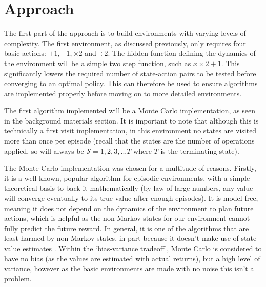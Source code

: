 \chapter{Approach}
\begin{comment}
\begin{itemize}
\item mc
\item mc with separate types then speed discarded
\item q learning
\item monte carlo etc
\end{itemize}
non markov - need ones dont use v
\end{comment}

The first part of the approach is to build environments with varying levels of complexity. The first environment, as discussed previously, only requires four basic actions: $+1, -1, \times2$ and $\div2$. The hidden function defining the dynamics of the environment will be a simple two step function, such as $x\times2+1$. This significantly lowers the required number of state-action pairs to be tested before converging to an optimal policy. This can therefore be used to ensure algorithms are implemented properly before moving on to more detailed environments. 

The first algorithm implemented will be a Monte Carlo implementation, as seen in the background materials section. It is important to note that although this is technically a first visit implementation, in this environment no states are visited more than once per episode (recall that the states are the number of operations applied, so will always be $\mathscr{S}=1,2,3,...T$ where $T$ is the terminating state). 

The Monte Carlo implementation was chosen for a multitude of reasons. Firstly, it is a well known, popular algorithm for episodic environments, with a simple theoretical basis to back it mathematically (by law of large numbers, any value will converge eventually to its true value after enough episodes). It is model free, meaning it does not depend on the dynamics of the environment to plan future actions, which is helpful as the non-Markov states for our environment cannot fully predict the future reward. In general, it is one of the algorithms that are least harmed by non-Markov states, in part because it doesn't make use of state value estimates \cite{Sutton:RLIntro115}. Within the `bias-variance tradeoff', Monte Carlo is considered to have no bias (as the values are estimated with actual returns), but a high level of variance, however as the basic environments are made with no noise this isn't a problem.

